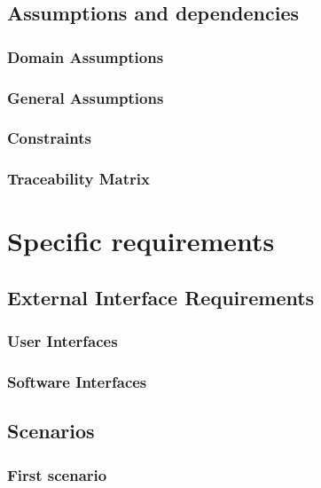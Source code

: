 \documentclass[12pt]{article}
\begin{document}
	\subsection{Assumptions and dependencies}
	\subsubsection{Domain Assumptions}
	
	
	\subsubsection{General Assumptions}
	
	\clearpage
	\subsubsection{Constraints}
	
	\subsubsection{Traceability Matrix}
	
	
	\clearpage
	\section{Specific requirements}
	\subsection{External Interface Requirements}
	\subsubsection{User Interfaces}
	
	\subsubsection{Software Interfaces}
	
	
	\clearpage
	\subsection{Scenarios}
	\subsubsection{First scenario}
	
	\FloatBarrier
\end{document}
